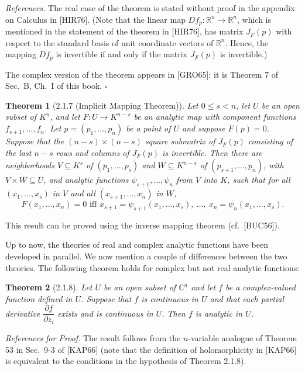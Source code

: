 \documentclass[11pt]{article}
\theoremstyle{plain}
\newtheorem*{theorem*}{Theorem}
\theoremstyle{definition}
\newcommand{\R}{\mathbb{R}}
\newcommand{\C}{\mathbb{C}}
\begin{document}
\textit{References.} The real case of the theorem is stated without
proof in the appendix on Calculus in [HIR76]. (Note that the linear map
$Df_p : \R^n \to \R^n$, which is mentioned in the statement of the
theorem in [HIR76], has matrix $J_F(p)$ with respect to the standard
basis of unit coordinate vectors of $\R^n$. Hence, the mapping $Df_p$ is
invertible if and only if the matrix $J_F(p)$ is invertible.)

The complex version of the theorem appears in [GRO65]: it is Theorem 7
of Sec.~B, Ch.~I of this book. $\square$

\begin{theorem*}[2.1.7 (Implicit Mapping Theorem)]
Let $0 \le s < n$, let $U$ be an open subset of $K^n$, and let
$F: U \to K^{n-s}$ be an analytic map with component functions
$f_{s+1}, \ldots, f_n$. Let $p = (p_1, \ldots, p_n)$ be a point of $U$
and suppose $F(p) = 0$. Suppose that the $(n-s) \times (n-s)$ square
submatrix of $J_F(p)$ consisting of the last $n-s$ rows and columns of
$J_F(p)$ is invertible. Then there are neighborhoods $V \subseteq K^s$
of $(p_1, \ldots, p_s)$ and $W \subseteq K^{n-s}$ of
$(p_{s+1}, \ldots, p_n)$, with $V \times W \subseteq U$, and analytic
functions $\psi_{s+1}, \ldots, \psi_n$ from $V$ into $K$, such that for
all $(x_1, \ldots, x_s)$ in $V$ and all $(x_{s+1}, \ldots, x_n)$ in $W$,
\[
F(x_1, \ldots, x_n) = 0 \text{ iff }
x_{s+1} = \psi_{s+1}(x_1, \ldots, x_s),\ \ldots,\
x_n = \psi_n(x_1, \ldots, x_s).
\]
\end{theorem*}

This result can be proved using the inverse mapping theorem
(cf.~[BUC56]).

Up to now, the theories of real and complex analytic functions have been
developed in parallel. We now mention a couple of differences between
the two theories. The following theorem holds for complex but not real
analytic functions:

\begin{theorem*}[2.1.8]
Let $U$ be an open subset of $\C^n$ and let $f$ be a complex-valued
function defined in $U$. Suppose that $f$ is continuous in $U$ and that
each partial derivative $\dfrac{\partial f}{\partial z_i}$ exists and is
continuous in $U$. Then $f$ is analytic in $U$.
\end{theorem*}

\textit{References for Proof.} The result follows from the $n$-variable
analogue of Theorem 53 in Sec.~9-3 of [KAP66] (note that the definition
of holomorphicity in [KAP66] is equivalent to the conditions in the
hypothesis of Theorem 2.1.8).
\end{document}
